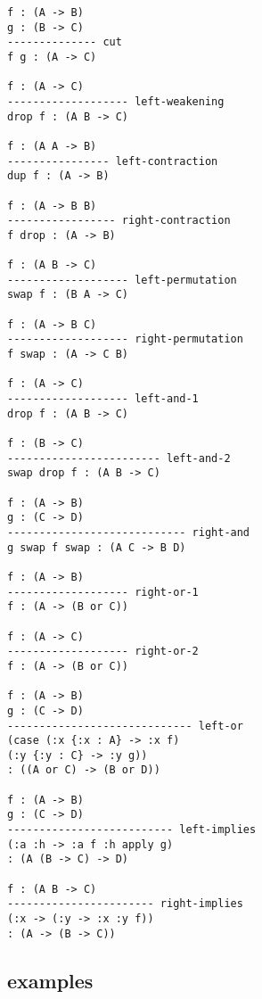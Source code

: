 \documentclass{sigplanconf}
\begin{document}
{\scriptsize\begin{verbatim}
f : (A -> B)
g : (B -> C)
-------------- cut
f g : (A -> C)

f : (A -> C)
------------------- left-weakening
drop f : (A B -> C)

f : (A A -> B)
---------------- left-contraction
dup f : (A -> B)

f : (A -> B B)
----------------- right-contraction
f drop : (A -> B)

f : (A B -> C)
------------------- left-permutation
swap f : (B A -> C)

f : (A -> B C)
------------------- right-permutation
f swap : (A -> C B)

f : (A -> C)
------------------- left-and-1
drop f : (A B -> C)

f : (B -> C)
------------------------ left-and-2
swap drop f : (A B -> C)

f : (A -> B)
g : (C -> D)
---------------------------- right-and
g swap f swap : (A C -> B D)

f : (A -> B)
------------------- right-or-1
f : (A -> (B or C))

f : (A -> C)
------------------- right-or-2
f : (A -> (B or C))

f : (A -> B)
g : (C -> D)
----------------------------- left-or
(case (:x {:x : A} -> :x f)
(:y {:y : C} -> :y g))
: ((A or C) -> (B or D))

f : (A -> B)
g : (C -> D)
-------------------------- left-implies
(:a :h -> :a f :h apply g)
: (A (B -> C) -> D)

f : (A B -> C)
----------------------- right-implies
(:x -> (:y -> :x :y f))
: (A -> (B -> C))
\end{verbatim}}

\subsection{examples}
\end{document}
